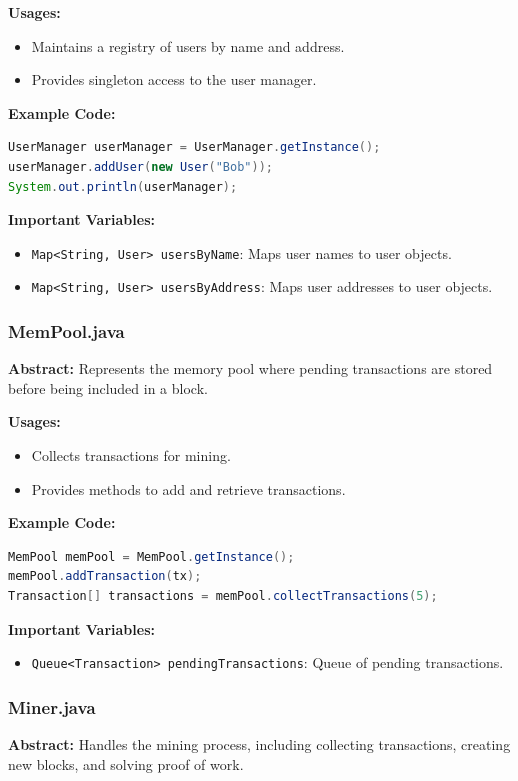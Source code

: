 \documentclass[12pt]{article}
\begin{document}
\textbf{Usages:}
\begin{itemize}
    \item Maintains a registry of users by name and address.
    \item Provides singleton access to the user manager.
\end{itemize}

\textbf{Example Code:}
\begin{lstlisting}[language=Java]
UserManager userManager = UserManager.getInstance();
userManager.addUser(new User("Bob"));
System.out.println(userManager);
\end{lstlisting}

\textbf{Important Variables:}
\begin{itemize}
    \item \texttt{Map<String, User> usersByName}: Maps user names to user objects.
    \item \texttt{Map<String, User> usersByAddress}: Maps user addresses to user objects.
\end{itemize}

\subsubsection{MemPool.java}
\textbf{Abstract:} Represents the memory pool where pending transactions are stored before being included in a block.

\textbf{Usages:}
\begin{itemize}
    \item Collects transactions for mining.
    \item Provides methods to add and retrieve transactions.
\end{itemize}

\textbf{Example Code:}
\begin{lstlisting}[language=Java]
MemPool memPool = MemPool.getInstance();
memPool.addTransaction(tx);
Transaction[] transactions = memPool.collectTransactions(5);
\end{lstlisting}

\textbf{Important Variables:}
\begin{itemize}
    \item \texttt{Queue<Transaction> pendingTransactions}: Queue of pending transactions.
\end{itemize}

\subsubsection{Miner.java}
\textbf{Abstract:} Handles the mining process, including collecting transactions, creating new blocks, and solving proof of work.
\end{document}
